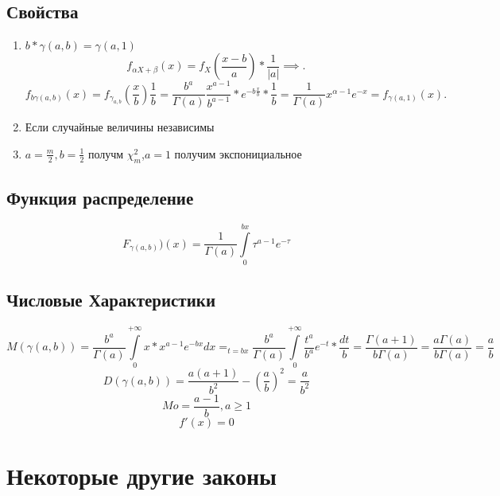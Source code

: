 \documentclass[14pt]{extarticle}
\begin{document}
 \subsection{Свойства}
  \begin{enumerate}
 	\item $b * \gamma(a,b) = \gamma(a,1)$ 
	\[
	f_{\alpha X + \beta}(x) = f_{X}( \frac{x -  b}{a} )*\frac{1}{|a|} \implies
	.\] 
	\[
		f_{b \gamma(a,b)}(x) = f_{\gamma_{a,b}}(\frac{x}{b})\frac{1}{b} = \frac{b^{a}}{\Gamma(a)} \frac{x^{a -1}}{b^{a-1} }*e^{-b \frac{x}{b}} * \frac{1}{b} = \frac{1}{\Gamma(a)} x^{\alpha-1}e^{-x} = f_{\gamma(a,1)}(x)
	.\] 
\item Если случайные величины независимы
\item $a = \frac{m}{2},b = \frac{1}{2}$ получм $\chi^{2}_{m}$,$a =1$ получим экспонициальное
 \end{enumerate}
 \subsection{Функция распределение}
 \begin{equation}
 	F_{\gamma(a,b)}) (x) = \frac{1}{\Gamma(a)} \int\limits_{0}^{bx}   \tau^{a - 1} e^{-\tau}
 \end{equation}
 \subsection{Числовые Характеристики}
 \begin{equation}
 	M(\gamma(a,b)) = \frac{b^{a}}{\Gamma(a)} \int\limits_{0}^{+\infty} x * x^{a-1}  e^{-bx} dx =_{t=bx} \frac{b^{a}}{\Gamma(a)}\int\limits_{0}^{+\infty}   \frac{t^{a}}{b^{a}} e^{-t} * \frac{dt}{b} = \frac{\Gamma(a+1)}{b\Gamma(a)} = \frac{a \Gamma(a)}{b \Gamma(a)}= \frac{a}{b}
 \end{equation}
 \begin{equation}
 	D(\gamma(a,b)) = \frac{a(a+1)}{b^{2}} - (\frac{a}{b})^{2}=
	\frac{a}{b^2}
 \end{equation}
 \begin{equation}
 	Mo = \frac{a - 1}{b} ,a\ge 1
 \end{equation}
\begin{equation}
 	f'(x) = 0
\end{equation}
\section{Некоторые другие законы}
\end{document}
